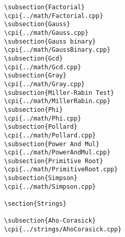 {\begin{verbatim}
\subsection{Factorial}
\cpi{../math/Factorial.cpp}
\subsection{Gauss}
\cpi{../math/Gauss.cpp}
\subsection{Gauss binary}
\cpi{../math/GaussBinary.cpp}
\subsection{Gcd}
\cpi{../math/Gcd.cpp}
\subsection{Gray}
\cpi{../math/Gray.cpp}
\subsection{Miller-Rabin Test}
\cpi{../math/MillerRabin.cpp}
\subsection{Phi}
\cpi{../math/Phi.cpp}
\subsection{Pollard}
\cpi{../math/Pollard.cpp}
\subsection{Power And Mul}
\cpi{../math/PowerAndMul.cpp}
\subsection{Primitive Root}
\cpi{../math/PrimitiveRoot.cpp}
\subsection{Simpson}
\cpi{../math/Simpson.cpp}

\section{Strings}

\subsection{Aho-Corasick}
\cpi{../strings/AhoCorasick.cpp}

\end{verbatim}}
